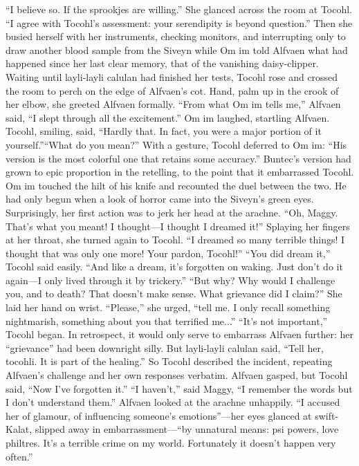 \documentclass[9pt]{article}
\begin{document}
“I believe so. If the sprookjes are willing.” She glanced across the room at Tocohl. “I agree with
Tocohl’s assessment: your serendipity is beyond question.” Then she busied herself with her instruments,
checking monitors, and interrupting only to draw another blood sample from the Siveyn while Om im told
Alfvaen what had happened since her last clear memory, that of the vanishing daisy-clipper.
Waiting until layli-layli calulan had finished her tests, Tocohl rose and crossed the room to perch on
the edge of Alfvaen’s cot. Hand, palm up in the crook of her elbow, she greeted Alfvaen formally.
“From what Om im tells me,” Alfvaen said, “I slept through all the excitement.”
Om im laughed, startling Alfvaen. Tocohl, smiling, said, “Hardly that. In fact, you were a major
portion of it yourself.”“What do you mean?”
With a gesture, Tocohl deferred to Om im: “His version is the most colorful one that retains some
accuracy.” Buntec’s version had grown to epic proportion in the retelling, to the point that it embarrassed
Tocohl.
Om im touched the hilt of his knife and recounted the duel between the two. He had only begun when
a look of horror came into the Siveyn’s green eyes. Surprisingly, her first action was to jerk her head at
the arachne. “Oh, Maggy. That’s what you meant! I thought—I thought I dreamed it!”
Splaying her fingers at her throat, she turned again to Tocohl. “I dreamed so many terrible things! I
thought that was only one more! Your pardon, Tocohl!”
“You did dream it,” Tocohl said easily. “And like a dream, it’s forgotten on waking. Just don’t do it
again—I only lived through it by trickery.”
“But why? Why would I challenge you, and to death? That doesn’t make sense. What grievance did
I claim?” She laid her hand on wrist. “Please,” she urged, “tell me. I only recall something nightmarish,
something about you that terrified me...”
“It’s not important,” Tocohl began. In retrospect, it would only serve to embarrass Alfvaen further:
her “grievance” had been downright silly.
But layli-layli calulan said, “Tell her, tocohli. It is part of the healing.” So Tocohl described the
incident, repeating Alfvaen’s challenge and her own responses verbatim.
Alfvaen gasped, but Tocohl said, “Now I’ve forgotten it.”
“I haven’t,” said Maggy, “I remember the words but I don’t understand them.”
Alfvaen looked at the arachne unhappily. “I accused her of glamour, of influencing someone’s
emotions”—her eyes glanced at swift-Kalat, slipped away in embarrassment—“by unnatural means: psi
powers, love philtres. It’s a terrible crime on my world. Fortunately it doesn’t happen very often.”
\end{document}
